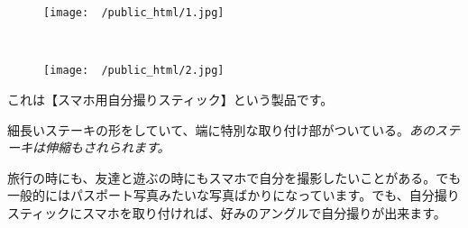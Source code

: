 \documentclass[10pt]{book}
\begin{document}
\begin{figure}[H]
        \centering
        \begin{subfloat}{}
                {\texttt{[image: ~/public\_html/1.jpg]}}
        \end{subfloat}~
        \begin{subfloat}{}
                {\texttt{[image: ~/public\_html/2.jpg]}}
        \end{subfloat}
\end{figure}\vspace{1in}
これは【スマホ用自分撮りスティック】という製品です。\\\newline

細長いステーキの形をしていて、端に特別な取り付け部がついている。{\it あのステーキは伸縮もされられます。}\\\newline

旅行の時にも、友達と遊ぶの時にもスマホで自分を撮影したいことがある。でも一般的にはパスポート写真みたいな写真ばかりになっています。でも、自分撮りスティックにスマホを取り付ければ、好みのアングルで自分撮りが出来ます。
\end{document}
